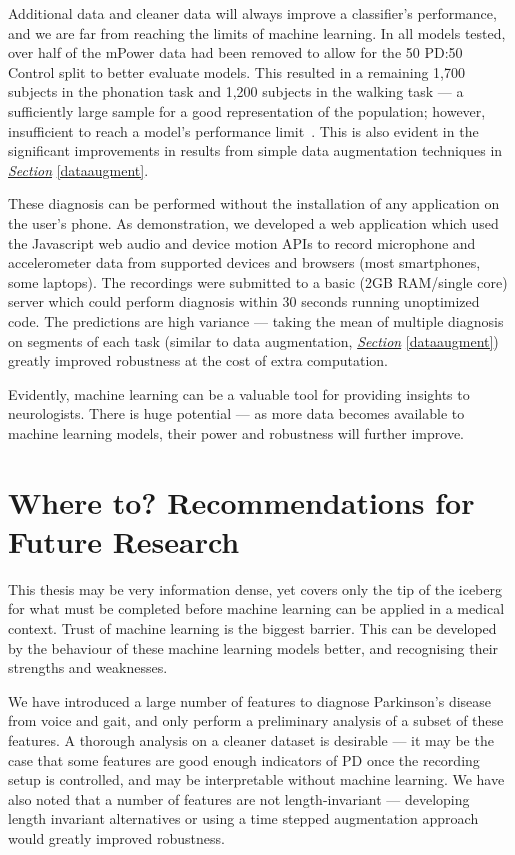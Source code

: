 \documentclass[12pt, twoside]{book}
\renewcommand\emph[1]{\textit{\color{USred}{#1}}}
\begin{document}
Additional data and cleaner data will always improve a classifier's performance, and we are far from reaching the limits of machine learning. In all models tested, over half of the mPower data had been removed to allow for the 50 PD:50 Control split to better evaluate models. This resulted in a remaining 1,700 subjects in the phonation task and 1,200 subjects in the walking task --- a sufficiently large sample for a good representation of the population; however, insufficient to reach a model's performance limit~\cite{cho2015much}. This is also evident in the significant improvements in results from simple data augmentation techniques in \textit{\hyperref[dataaugment]{Section}} \ref{dataaugment}. 


These diagnosis can be performed without the installation of any application on the user's phone. As demonstration, we developed a web application which used the Javascript web audio and device motion APIs to record microphone and accelerometer data from supported devices and browsers (most smartphones, some laptops). The recordings were submitted to a basic (2GB RAM/single core) server which could perform diagnosis within 30 seconds running unoptimized code. The predictions are high variance --- taking the mean of multiple diagnosis on segments of each task (similar to data augmentation, \textit{\hyperref[dataaugment]{Section}} \ref{dataaugment}) greatly improved robustness at the cost of extra computation.

Evidently, machine learning can be a valuable tool for providing insights to neurologists. There is huge potential --- as more data becomes available to machine learning models, their power and robustness will further improve. 

\section{Where to? Recommendations for Future Research}

This thesis may be very information dense, yet covers only the tip of the iceberg for what must be completed before machine learning can be applied in a medical context. Trust of machine learning is the biggest barrier. This can be developed by \emph{understanding} the behaviour of these machine learning models better, and recognising their strengths and weaknesses.

We have introduced a large number of features to diagnose Parkinson's disease from voice and gait, and only perform a preliminary analysis of a subset of these features. A thorough analysis on a cleaner dataset is desirable --- it may be the case that some features are good enough indicators of PD once the recording setup is controlled, and may be interpretable without machine learning. We have also noted that a number of features are not length-invariant --- developing length invariant alternatives or using a time stepped augmentation approach would greatly improved robustness.
\end{document}
